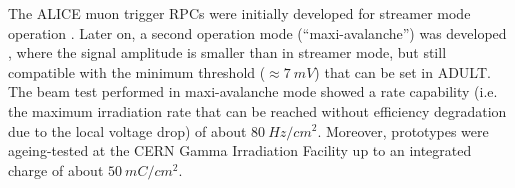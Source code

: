 The ALICE muon trigger RPCs were initially developed for streamer mode operation \cite{Arnaldi:2000ub}.
Later on, a second operation mode (“maxi-avalanche”) was developed \cite{Arnaldi:2006ii}, where the signal amplitude is smaller than in streamer mode, but still compatible with the minimum threshold ($\approx7\ mV$) that can be set in  ADULT. 
The beam test performed in maxi-avalanche mode showed a rate capability (i.e. the maximum irradiation rate that can be reached without efficiency degradation due to the local voltage drop) of about $80\ Hz/cm^2$. 
Moreover, prototypes were ageing-tested at the CERN Gamma Irradiation Facility up to an integrated charge of about $50\ mC/cm^2$.


